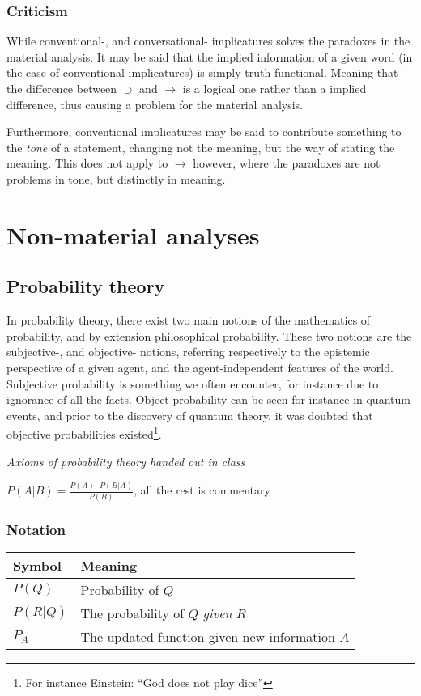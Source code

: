 \documentclass[12pt]{report}
\begin{document}
\subsection{Criticism}

While conventional-, and conversational- implicatures solves the paradoxes in
the material analysis. It may be said that the implied information of a given
word (in the case of conventional implicatures) is simply truth-functional.
Meaning that the difference between $\supset$ and $\rightarrow$ is a logical one
rather than a implied difference, thus causing a problem for the material
analysis.

Furthermore, conventional implicatures may be said to contribute something to the
\emph{tone} of a statement, changing not the meaning, but the way of stating the
meaning. This does not apply to $\rightarrow$ however, where the paradoxes are
not problems in tone, but distinctly in meaning.

\chapter{Non-material analyses}

\section{Probability theory}

In probability theory, there exist two main notions of the mathematics of
probability, and by extension philosophical probability. These two notions are
the subjective-, and objective- notions, referring respectively to the epistemic
perspective of a given agent, and the agent-independent features of the world.
Subjective probability is something we often encounter, for instance due to
ignorance of all the facts. Object probability can be seen for instance in
quantum events, and prior to the discovery of quantum theory, it was doubted
that objective probabilities existed\footnote{For instance Einstein: ``God does
not play dice''}.

\textit{Axioms of probability theory handed out in class}

$P(A|B) = \frac{P(A) \cdot P(B|A)}{P(B)}$, all the rest is commentary

\subsection{Notation}
\begin{tabular}{l|l}
Symbol & Meaning \\
\hline
$P(Q)$ & Probability of $Q$\\
$P(R|Q)$ & The probability of $Q$ \emph{given} $R$\\
$P_A$ & The updated function given new information $A$\\
\end{tabular}
\end{document}
